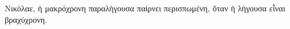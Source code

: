 \documentclass[a4paper]{book}
\begin{document}
\beginnumbering
\numberpstarttrue
\pstart
{}Νικόλαε, ἡ μακρόχρονη παραλήγουσα παίρνει περισπωμένη, ὅταν ἡ λήγουσα εἶναι βραχύχρονη.
\pend
\endnumbering
\printindex
\end{document}
